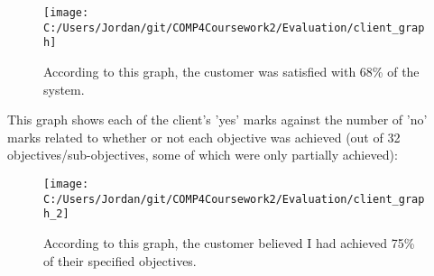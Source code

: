 \begin{figure}[H]
	\texttt{[image: C:/Users/Jordan/git/COMP4Coursework2/Evaluation/client\_graph]}
	\caption{According to this graph, the customer was satisfied with 68\% of the system.}
\end{figure}

This graph shows each of the client's 'yes' marks  against the number of 'no' marks related to whether or not each objective was achieved (out of 32 objectives/sub-objectives, some of which were only partially achieved):

\begin{figure}[H]
	\texttt{[image: C:/Users/Jordan/git/COMP4Coursework2/Evaluation/client\_graph\_2]}
	\caption{According to this graph, the customer believed I had achieved 75\% of their specified objectives.}
\end{figure}